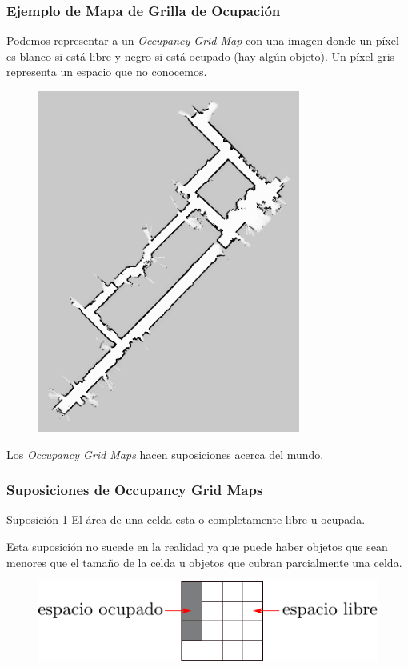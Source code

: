 \begin{frame}
    \frametitle{Ejemplo de Mapa de Grilla de Ocupación}
    
    Podemos representar a un \emph{Occupancy Grid Map} con una imagen donde un píxel es blanco si está libre y negro si está ocupado (hay algún objeto). Un píxel gris representa un espacio que no conocemos.
    
  	\begin{figure}[!h]
    		\includegraphics[width=0.23\columnwidth]{./images/volumetric_map_2d.png}
    \end{figure}


	Los \emph{Occupancy Grid Maps} hacen suposiciones acerca del mundo.
       
\end{frame}

\begin{frame}
    \frametitle{Suposiciones de Occupancy Grid Maps}
    
    \begin{block}{Suposición 1}
	    El área de una celda esta o completamente libre u ocupada.
    \end{block}

	Esta suposición no sucede en la realidad ya que puede haber objetos que sean menores que el tamaño de la celda u objetos que cubran parcialmente una celda.
	
  	\begin{figure}[!h]
		\includegraphics[width=0.7\columnwidth]{./images/grid_map.pdf}
	\end{figure}
	
\end{frame}

